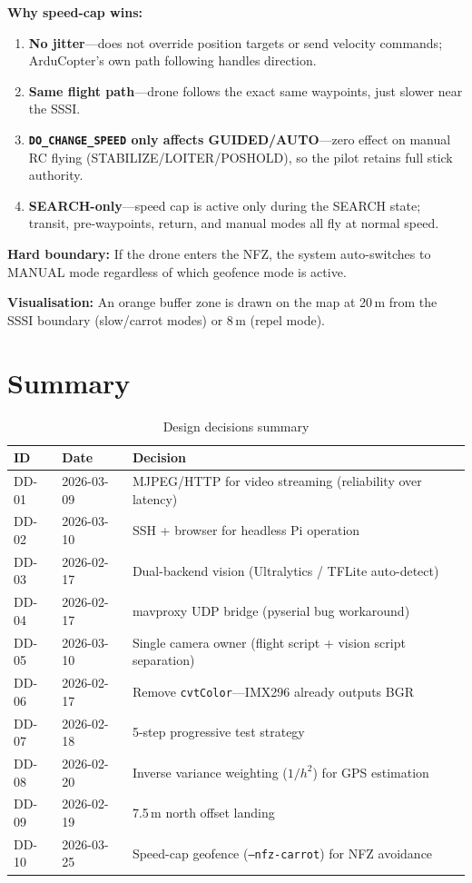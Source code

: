 \documentclass[10pt,a4paper]{article}
\newcommand{\compactTable}{\small\setlength{\tabcolsep}{3pt}\renewcommand{\arraystretch}{1.05}}
\newcommand{\ddlabel}[1]{\textbf{\color{headblue}#1}\hspace{0.5em}}
\begin{document}
\ddlabel{Why speed-cap wins:}
\begin{enumerate}
  \item \textbf{No jitter}---does not override position targets or send velocity commands; ArduCopter's own path following handles direction.
  \item \textbf{Same flight path}---drone follows the exact same waypoints, just slower near the SSSI.
  \item \textbf{\texttt{DO\_CHANGE\_SPEED} only affects GUIDED/AUTO}---zero effect on manual RC flying (STABILIZE/LOITER/POSHOLD), so the pilot retains full stick authority.
  \item \textbf{SEARCH-only}---speed cap is active only during the SEARCH state; transit, pre-waypoints, return, and manual modes all fly at normal speed.
\end{enumerate}

\ddlabel{Hard boundary:} If the drone enters the NFZ, the system auto-switches to MANUAL mode regardless of which geofence mode is active.

\ddlabel{Visualisation:} An orange buffer zone is drawn on the map at 20\,m from the SSSI boundary (slow/carrot modes) or 8\,m (repel mode).

\section{Summary}

\begin{table}[H]
\centering
\compactTable
\caption{Design decisions summary}
\label{tab:summary}
\begin{tabularx}{\textwidth}{l l X}
\toprule
\textbf{ID} & \textbf{Date} & \textbf{Decision} \\
\midrule
DD-01 & 2026-03-09 & MJPEG/HTTP for video streaming (reliability over latency) \\
DD-02 & 2026-03-10 & SSH + browser for headless Pi operation \\
DD-03 & 2026-02-17 & Dual-backend vision (Ultralytics / TFLite auto-detect) \\
DD-04 & 2026-02-17 & mavproxy UDP bridge (pyserial bug workaround) \\
DD-05 & 2026-03-10 & Single camera owner (flight script + vision script separation) \\
DD-06 & 2026-02-17 & Remove \texttt{cvtColor}---IMX296 already outputs BGR \\
DD-07 & 2026-02-18 & 5-step progressive test strategy \\
DD-08 & 2026-02-20 & Inverse variance weighting ($1/h^{2}$) for GPS estimation \\
DD-09 & 2026-02-19 & 7.5\,m north offset landing \\
DD-10 & 2026-03-25 & Speed-cap geofence (\texttt{--nfz-carrot}) for NFZ avoidance \\
\bottomrule
\end{tabularx}
\end{table}
\end{document}
